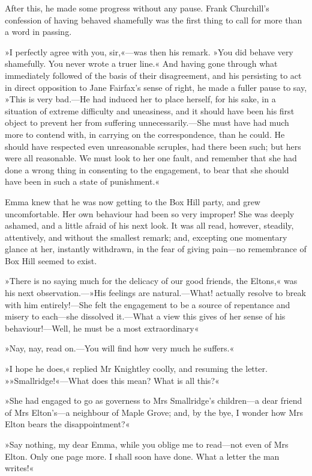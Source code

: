 After this, he made some progress without any pause. Frank Churchill's confession of having behaved shamefully was the first thing to call for more than a word in passing.

»I perfectly agree with you, sir,«—was then his remark. »You did behave very shamefully. You never wrote a truer line.« And having gone through what immediately followed of the basis of their disagreement, and his persisting to act in direct opposition to Jane Fairfax's sense of right, he made a fuller pause to say, »This is very bad.—He had induced her to place herself, for his sake, in a situation of extreme difficulty and uneasiness, and it should have been his first object to prevent her from suffering unnecessarily.—She must have had much more to contend with, in carrying on the correspondence, than he could. He should have respected even unreasonable scruples, had there been such; but hers were all reasonable. We must look to her one fault, and remember that she had done a wrong thing in consenting to the engagement, to bear that she should have been in such a state of punishment.«

Emma knew that he was now getting to the Box Hill party, and grew uncomfortable. Her own behaviour had been so very improper! She was deeply ashamed, and a little afraid of his next look. It was all read, however, steadily, attentively, and without the smallest remark; and, excepting one momentary glance at her, instantly withdrawn, in the fear of giving pain—no remembrance of Box Hill seemed to exist.

»There is no saying much for the delicacy of our good friends, the Eltons,« was his next observation.—»His feelings are natural.—What! actually resolve to break with him entirely!—She felt the engagement to be a source of repentance and misery to each—she dissolved it.—What a view this gives of her sense of his behaviour!—Well, he must be a most extraordinary\longdash«

»Nay, nay, read on.—You will find how very much he suffers.«

»I hope he does,« replied Mr Knightley coolly, and resuming the letter. »»Smallridge!«—What does this mean? What is all this?«

»She had engaged to go as governess to Mrs Smallridge's children—a dear friend of Mrs Elton's—a neighbour of Maple Grove; and, by the bye, I wonder how Mrs Elton bears the disappointment?«

»Say nothing, my dear Emma, while you oblige me to read—not even of Mrs Elton. Only one page more. I shall soon have done. What a letter the man writes!«

